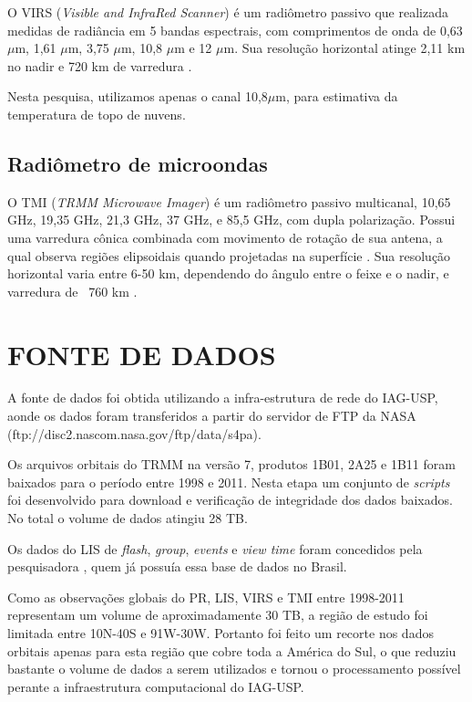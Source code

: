 O VIRS (\textit{Visible and InfraRed Scanner}) é um radiômetro passivo que realizada medidas de radiância em 5 bandas espectrais, com comprimentos de onda de 0,63 $\mu$m, 1,61 $\mu$m, 3,75 $\mu$m, 10,8 $\mu$m e 12 $\mu$m. Sua resolução horizontal atinge 2,11 km no nadir e 720 km de varredura \cite{trmmhandbook}.

Nesta pesquisa, utilizamos apenas o canal  10,8$\mu$m, para estimativa da temperatura de topo de nuvens.

\subsection{Radiômetro de microondas}

O TMI (\textit{TRMM Microwave Imager}) é um radiômetro passivo multicanal, 10,65 GHz, 19,35 GHz, 21,3 GHz, 37 GHz, e 85,5 GHz, com dupla polarização. Possui uma varredura cônica combinada com movimento de rotação de sua antena, a qual observa regiões elipsoidais quando projetadas na superfície \cite{kummerok1998}. Sua resolução horizontal varia entre 6-50 km, dependendo do ângulo entre o feixe e o nadir, e varredura de ~760 km \cite{trmmhandbook}. 

\section{FONTE DE DADOS}

A fonte de dados foi obtida utilizando a infra-estrutura de rede do IAG-USP, aonde os dados foram transferidos a partir do servidor de FTP da NASA (ftp://disc2.nascom.nasa.gov/ftp/data/s4pa). 

Os arquivos orbitais do TRMM na versão 7, produtos 1B01, 2A25 e 1B11 foram baixados para o período entre 1998 e 2011. Nesta etapa um conjunto de \textit{scripts} foi desenvolvido para download e verificação de integridade dos dados baixados. No total o volume de dados atingiu 28 TB.  %

Os dados do LIS de \textit{flash}, \textit{group}, \textit{events} e \textit{view time} foram concedidos pela pesquisadora , quem já possuía essa base de dados no Brasil. 

Como as observações globais do PR, LIS, VIRS e TMI entre 1998-2011 representam um volume de aproximadamente 30 TB, a região de estudo foi limitada entre 10N-40S e 91W-30W. Portanto foi feito um recorte nos dados orbitais apenas para esta região que cobre toda a América do Sul, o que reduziu bastante o volume de dados a serem utilizados e tornou o processamento possível perante a infraestrutura computacional do IAG-USP.

